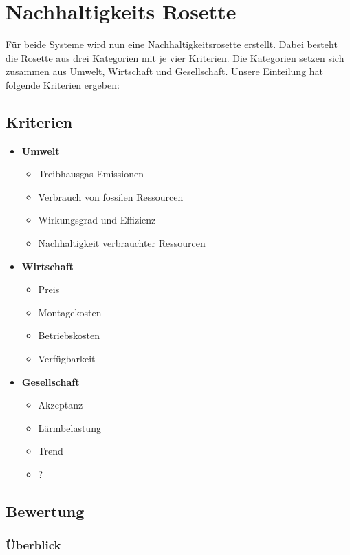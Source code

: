 \chapter{Nachhaltigkeits Rosette}
\label{chap:rosette}

Für beide Systeme wird nun eine Nachhaltigkeitsrosette erstellt. Dabei besteht die Rosette aus drei Kategorien mit je vier Kriterien. Die Kategorien setzen sich zusammen aus Umwelt, Wirtschaft und Gesellschaft. Unsere Einteilung hat folgende Kriterien ergeben:

\section{Kriterien}

\begin{itemize}
  \item \textbf{Umwelt}
    \begin{itemize}
      \item Treibhausgas Emissionen
      \item Verbrauch von fossilen Ressourcen
      \item Wirkungsgrad und Effizienz
      \item Nachhaltigkeit verbrauchter Ressourcen
    \end{itemize}
 \item \textbf{Wirtschaft}
    \begin{itemize}
      \item Preis
      \item Montagekosten
      \item Betriebskosten
      \item Verfügbarkeit
    \end{itemize}
 \item \textbf{Gesellschaft}
    \begin{itemize}
      \item Akzeptanz
      \item Lärmbelastung
      \item Trend
      \item ?
    \end{itemize}
\end{itemize}

\section{Bewertung}
\subsection{Überblick}

